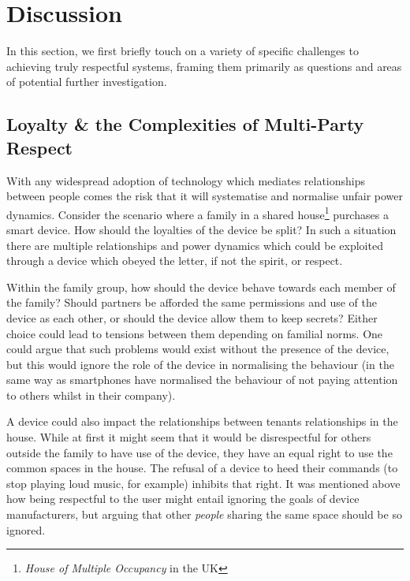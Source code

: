 \documentclass{IETpaper}
\begin{document}
\section{Discussion}

In this section, we first briefly touch on a variety of specific challenges to achieving
truly respectful systems, framing them primarily as questions and areas of potential
further investigation.

\subsection{Loyalty \& the Complexities of Multi-Party Respect}
With any widespread adoption of technology which mediates relationships between people comes the risk that it will systematise and normalise unfair power dynamics. Consider the scenario where a family in a shared house\footnote{\textit{House of Multiple Occupancy} in the UK} purchases a smart device. How should the loyalties of the device be split? In such a situation there are multiple relationships and power dynamics which could be exploited through a device which obeyed the letter, if not the spirit, or respect.

Within the family group, how should the device behave towards each member of the family? Should partners be afforded the same permissions and use of the device as each other, or should the device allow them to keep secrets? Either choice could lead to tensions between them depending on familial norms. One could argue that such problems would exist without the presence of the device, but this would ignore the role of the device in normalising the behaviour (in the same way as smartphones have normalised the behaviour of not paying attention to others whilst in their company). 

A device could also impact the relationships between tenants relationships in the house. While at first it might seem that it would be disrespectful for others outside the family to have use of the device, they have an equal right to use the common spaces in the house. The refusal of a device to heed their commands (to stop playing loud music, for example) inhibits that right. It was mentioned above how being respectful to the user might entail ignoring the goals of device manufacturers, but arguing that other \textit{people} sharing the same space should be so ignored.
\end{document}

